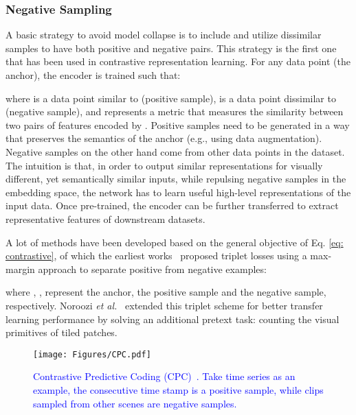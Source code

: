 \documentclass[lettersize,journal]{IEEEtran}
\newcommand{\etal}{\textit{et al.}}
\begin{document}
\subsubsection{Negative Sampling}

A basic strategy to avoid model collapse is to include and utilize dissimilar samples to have both positive and negative pairs. This strategy is the first one that has been used in contrastive representation learning. For any data point  (the anchor), the encoder  is trained such that:



\noindent where  is a data point similar to  (positive sample),  is a data point dissimilar to  (negative sample), and  represents a metric that measures the similarity between two pairs of features encoded by . Positive samples need to be generated in a way that preserves the semantics of the anchor  (e.g., using data augmentation). Negative samples on the other hand come from other data points in the dataset. The intuition is that, in order to output similar representations for visually different, yet semantically similar inputs, while repulsing negative samples in the embedding space, the network has to learn useful high-level representations of the input data. Once pre-trained, the encoder  can be further transferred to extract representative features of downstream datasets.  

A lot of methods have been developed based on the general objective of Eq. \ref{eq: contrastive}, of which the earliest works~\cite{chopra2005learning,weinberger2009distance,schroff2015facenet} proposed triplet losses using a max-margin approach to separate positive from negative examples:



\noindent where , ,  represent the anchor, the positive sample and the negative sample, respectively. Noroozi \etal~\cite{noroozi2017representation} extended this triplet scheme for better transfer learning performance by solving an additional pretext task: counting the visual primitives of tiled patches.


\begin{figure}
\centering
\texttt{[image: Figures/CPC.pdf]}
\caption[CPC]{
\textcolor{blue}{Contrastive Predictive Coding (CPC)~\cite{oord2018representation}. Take time series as an example, the consecutive time stamp is a positive sample, while clips sampled from other scenes are negative samples.}
}
\label{fig:CPC}
\end{figure}
\end{document}
